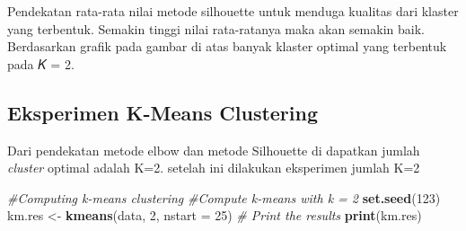 \documentclass[
]{elegantbook}
\newenvironment{Shaded}{\begin{snugshade}}{\end{snugshade}}
\newcommand{\AttributeTok}[1]{\textcolor[rgb]{0.13,0.29,0.53}{#1}}
\newcommand{\CommentTok}[1]{\textcolor[rgb]{0.56,0.35,0.01}{\textit{#1}}}
\newcommand{\DecValTok}[1]{\textcolor[rgb]{0.00,0.00,0.81}{#1}}
\newcommand{\FunctionTok}[1]{\textcolor[rgb]{0.13,0.29,0.53}{\textbf{#1}}}
\newcommand{\NormalTok}[1]{#1}
\newcommand{\OtherTok}[1]{\textcolor[rgb]{0.56,0.35,0.01}{#1}}
\begin{document}
Pendekatan rata-rata nilai metode silhouette untuk menduga kualitas dari klaster yang terbentuk. Semakin tinggi nilai rata-ratanya maka akan semakin baik. Berdasarkan grafik pada gambar di atas banyak klaster optimal yang terbentuk pada 𝐾 = 2.

\hypertarget{eksperimen-k-means-clustering}{%
\subsection{Eksperimen K-Means Clustering}\label{eksperimen-k-means-clustering}}

Dari pendekatan metode elbow dan metode Silhouette di dapatkan jumlah \emph{cluster} optimal adalah K=2. setelah ini dilakukan eksperimen jumlah K=2

\begin{Shaded}
\begin{Highlighting}[]
\CommentTok{\#Computing k{-}means clustering}
\CommentTok{\#Compute k{-}means with k = 2}
\FunctionTok{set.seed}\NormalTok{(}\DecValTok{123}\NormalTok{)}
\NormalTok{km.res }\OtherTok{\textless{}{-}} \FunctionTok{kmeans}\NormalTok{(data, }\DecValTok{2}\NormalTok{, }\AttributeTok{nstart =} \DecValTok{25}\NormalTok{)}
\CommentTok{\# Print the results}
\FunctionTok{print}\NormalTok{(km.res)}
\end{Highlighting}
\end{Shaded}
\end{document}
